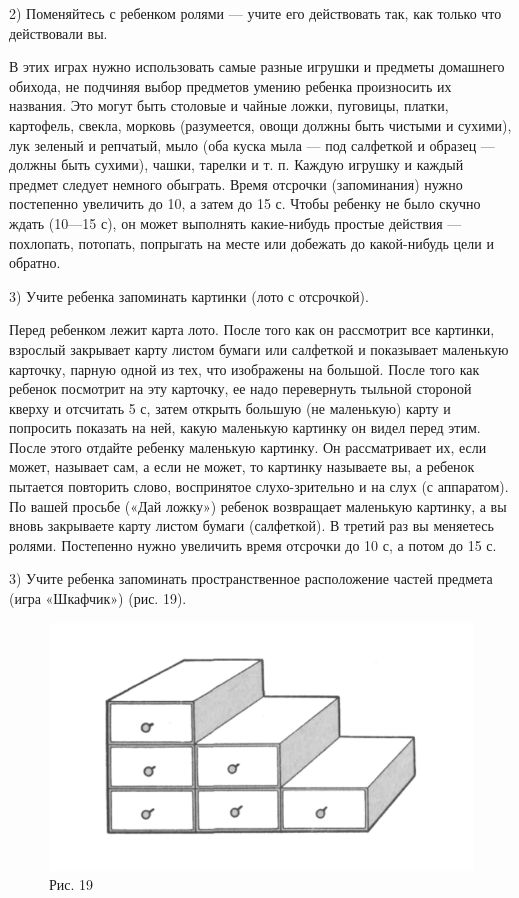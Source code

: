 \documentclass[a5paper]{book}
\begin{document}
2) Поменяйтесь с ребенком ролями --- учите его действовать так, как
только что действовали вы.

В этих играх нужно использовать самые разные игрушки и предметы
домашнего обихода, не подчиняя выбор предметов умению ребенка
произносить их названия. Это могут быть столовые и чайные ложки,
пуговицы, платки, картофель, свекла, морковь (разумеется, овощи должны
быть чистыми и сухими), лук зеленый и репчатый, мыло (оба куска мыла ---
под салфеткой и образец --- должны быть сухими), чашки, тарелки и т. п.
Каждую игрушку и каждый предмет следует немного обыграть. Время отсрочки
(запоминания) нужно постепенно увеличить до 10, а затем до 15 с. Чтобы
ребенку не было скучно ждать (10---15 с), он может выполнять
какие-нибудь простые действия --- похлопать, потопать, попрыгать на
месте или добежать до какой-нибудь цели и обратно.

3) Учите ребенка запоминать картинки (лото с отсрочкой).

Перед ребенком лежит карта лото. После того как он рассмотрит все
картинки, взрослый закрывает карту листом бумаги или салфеткой и
показывает маленькую карточку, парную одной из тех, что изображены на
большой. После того как ребенок посмотрит на эту карточку, ее надо
перевернуть тыльной стороной кверху и отсчитать 5 с, затем открыть
большую (не маленькую) карту и попросить показать на ней, какую
маленькую картинку он видел перед этим. После этого отдайте ребенку
маленькую картинку. Он рассматривает их, если может, называет сам, а
если не может, то картинку называете вы, а ребенок пытается повторить
слово, воспринятое слухо-зрительно и на слух (с аппаратом). По вашей
просьбе («Дай ложку») ребенок возвращает маленькую картинку, а вы вновь
закрываете карту листом бумаги (салфеткой). В третий раз вы меняетесь
ролями. Постепенно нужно увеличить время отсрочки до 10 с, а потом до 15
с.

3) Учите ребенка запоминать пространственное расположение частей
предмета (игра «Шкафчик») (рис. 19).

\begin{figure}
\centering
\includegraphics[width=\linewidth]{media/media/image16.png}
\caption*{Рис. 19}
\end{figure}
\end{document}
